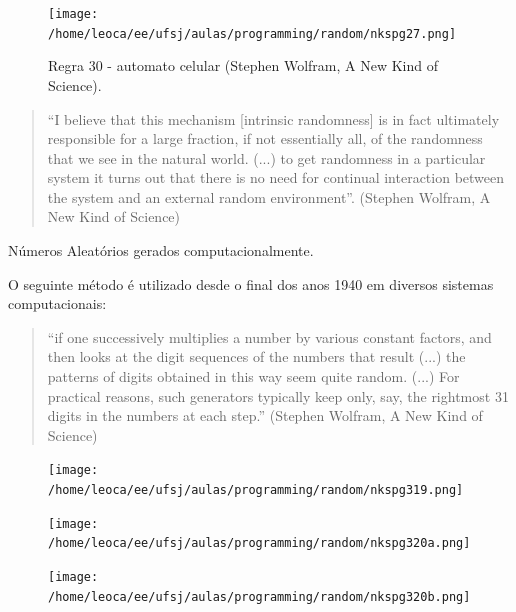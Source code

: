 \begin{frame}
  \framebreak

  \begin{figure}[h!]
  \centering
  \texttt{[image: /home/leoca/ee/ufsj/aulas/programming/random/nkspg27.png]}
  \caption{Regra 30 - automato celular (Stephen Wolfram, A New Kind of Science).}
  \label{fig:nkspg27}
  \end{figure}

  \framebreak

  \begin{quote}
  ``I believe that this mechanism [intrinsic randomness] is in fact ultimately
    responsible for a large fraction, if not essentially all, of the
    randomness that we see in the natural world. (...) to get randomness
    in a particular system it turns out that there is no need for continual
    interaction between the system and an external random environment''.
    (Stephen Wolfram, A New Kind of Science)
  \end{quote}

  \framebreak

  Números Aleatórios gerados computacionalmente.

  O seguinte método é utilizado desde o final dos anos 1940 em diversos sistemas computacionais:
  \begin{quote}
  ``if one successively multiplies a number by various constant factors,
    and then looks at the digit sequences of the numbers that result (...)
    the patterns of digits obtained in this way seem quite random. (...)
    For practical reasons, such generators typically keep only, say, the
    rightmost 31 digits in the numbers at each step.'' (Stephen Wolfram,
    A New Kind of Science)
  \end{quote}

  \framebreak 
  \begin{figure}[h!]
  \centering
  \texttt{[image: /home/leoca/ee/ufsj/aulas/programming/random/nkspg319.png]}
  \label{fig:nkspg319}
  \end{figure}

  \framebreak
  \begin{figure}[h!]
  \centering
  \texttt{[image: /home/leoca/ee/ufsj/aulas/programming/random/nkspg320a.png]}
  \label{fig:nkspg320a}
  \end{figure}

  \framebreak
  \begin{figure}[h!]
  \centering
  \texttt{[image: /home/leoca/ee/ufsj/aulas/programming/random/nkspg320b.png]}
  \label{fig:nkspg320b}
  \end{figure}


\end{frame}
